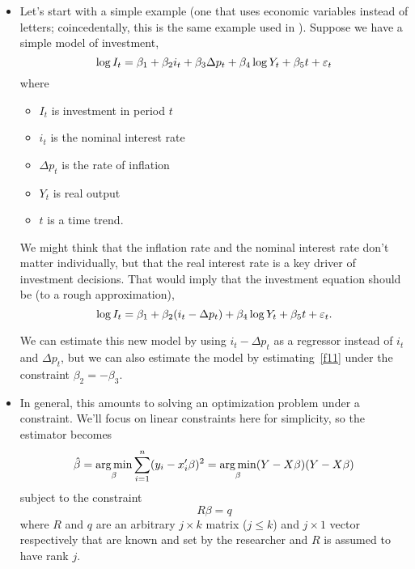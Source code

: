 \begin{itemize}[leftmargin=0pt]

\item Let's start with a simple example (one that uses economic
  variables instead of letters; coincedentally, this is the same
  example used in \citealp[p. 81]{Gre12}).  Suppose we have a simple
  model of investment,
  \begin{equation}\label{eq:1}
    \log I_t = \beta_1 + \beta_2 i_t + \beta_3 \Delta p_t + \beta_4 \log Y_t + \beta_5 t + \varepsilon_t
  \end{equation}
  where
  \begin{itemize}
  \item $I_t$ is investment in period $t$
  \item $i_t$ is the nominal interest rate
  \item $\Delta p_t$ is the rate of inflation
  \item $Y_t$ is real output
  \item $t$ is a time trend.
  \end{itemize}
  We might think that the inflation rate and the nominal interest rate
  don't matter individually, but that the real interest rate is a key
  driver of investment decisions.  That would imply that the
  investment equation should be (to a rough approximation),
  \begin{equation}\label{f11}
    \log I_t = \beta_1 + \beta_2 (i_t - \Delta p_t) + \beta_4 \log Y_t + \beta_5 t + \varepsilon_t.
  \end{equation}
  
  We can estimate this new model by using $i_t - \Delta p_t$ as a regressor
  instead of $i_t$ and $\Delta p_t$, but we can also estimate the model by
  estimating~\eqref{f11} under the constraint $\beta_2 = - \beta_3$.

\item In general, this amounts to solving an optimization problem
  under a constraint.  We'll focus on linear constraints here for
  simplicity, so the estimator becomes
  \begin{equation}\label{f4}
    \hat{\beta} = \operatorname*{arg\,min}_\beta \sum_{i=1}^n (y_i - x_i'\beta)^2 = \operatorname*{arg\,min}_\beta (Y - X\beta)(Y-X\beta)
  \end{equation}
  subject to the constraint
  \begin{equation}\label{f5}
    R \beta = q
  \end{equation}
  where $R$ and $q$ are an arbitrary $j \times k$ matrix ($j \leq k$) and $j \times
  1$ vector respectively that are known and set by the researcher and
  $R$ is assumed to have rank $j$.


\end{itemize}
